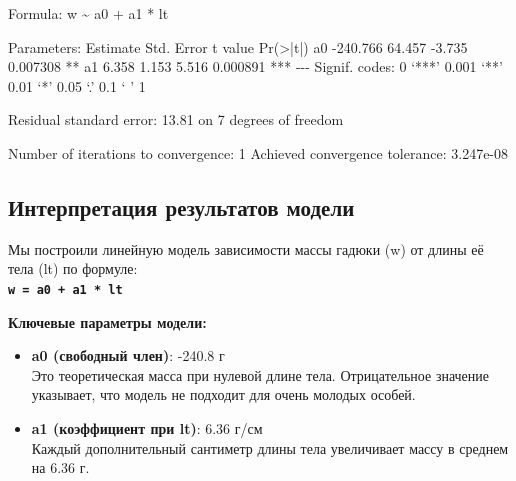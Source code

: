 \documentclass[
  letterpaper,
  DIV=11,
  numbers=noendperiod]{scrreprt}
\newenvironment{Shaded}{\begin{snugshade}}{\end{snugshade}}
\newcommand{\DecValTok}[1]{\textcolor[rgb]{0.68,0.00,0.00}{#1}}
\newcommand{\ErrorTok}[1]{\textcolor[rgb]{0.68,0.00,0.00}{#1}}
\newcommand{\FloatTok}[1]{\textcolor[rgb]{0.68,0.00,0.00}{#1}}
\newcommand{\FunctionTok}[1]{\textcolor[rgb]{0.28,0.35,0.67}{#1}}
\newcommand{\NormalTok}[1]{\textcolor[rgb]{0.00,0.23,0.31}{#1}}
\newcommand{\SpecialCharTok}[1]{\textcolor[rgb]{0.37,0.37,0.37}{#1}}
\begin{document}
\begin{Shaded}
\begin{Highlighting}[]
\NormalTok{Formula}\SpecialCharTok{:}\NormalTok{ w }\SpecialCharTok{\textasciitilde{}}\NormalTok{ a0 }\SpecialCharTok{+}\NormalTok{ a1 }\SpecialCharTok{*}\NormalTok{ lt}

\NormalTok{Parameters}\SpecialCharTok{:}
\NormalTok{   Estimate Std. Error t value }\FunctionTok{Pr}\NormalTok{(}\SpecialCharTok{\textgreater{}}\ErrorTok{|}\NormalTok{t}\SpecialCharTok{|}\NormalTok{)    }
\NormalTok{a0 }\SpecialCharTok{{-}}\FloatTok{240.766}     \FloatTok{64.457}  \SpecialCharTok{{-}}\FloatTok{3.735} \FloatTok{0.007308} \SpecialCharTok{**} 
\NormalTok{a1    }\FloatTok{6.358}      \FloatTok{1.153}   \FloatTok{5.516} \FloatTok{0.000891} \SpecialCharTok{**}\ErrorTok{*}
\SpecialCharTok{{-}{-}{-}}
\NormalTok{Signif. codes}\SpecialCharTok{:}  \DecValTok{0}\NormalTok{ ‘}\SpecialCharTok{**}\ErrorTok{*}\NormalTok{’ }\FloatTok{0.001}\NormalTok{ ‘}\SpecialCharTok{**}\NormalTok{’ }\FloatTok{0.01}\NormalTok{ ‘}\SpecialCharTok{*}\NormalTok{’ }\FloatTok{0.05}\NormalTok{ ‘.’ }\FloatTok{0.1}\NormalTok{ ‘ ’ }\DecValTok{1}

\NormalTok{Residual standard error}\SpecialCharTok{:} \FloatTok{13.81}\NormalTok{ on }\DecValTok{7}\NormalTok{ degrees of freedom}

\NormalTok{Number of iterations to convergence}\SpecialCharTok{:} \DecValTok{1} 
\NormalTok{Achieved convergence tolerance}\SpecialCharTok{:} \FloatTok{3.247e{-}08}
\end{Highlighting}
\end{Shaded}

\subsection{\texorpdfstring{\textbf{Интерпретация результатов
модели}}{Интерпретация результатов модели}}\label{ux438ux43dux442ux435ux440ux43fux440ux435ux442ux430ux446ux438ux44f-ux440ux435ux437ux443ux43bux44cux442ux430ux442ux43eux432-ux43cux43eux434ux435ux43bux438}

Мы построили линейную модель зависимости массы гадюки (w) от длины её
тела (lt) по формуле:\\
\textbf{\texttt{w\ =\ a0\ +\ a1\ *\ lt}}

\textbf{Ключевые параметры модели:}

\begin{itemize}
\item
  \textbf{a0 (свободный член)}: -240.8 г\\
  Это теоретическая масса при нулевой длине тела. Отрицательное значение
  указывает, что модель не подходит для очень молодых особей.
\item
  \textbf{a1 (коэффициент при lt)}: 6.36 г/см\\
  Каждый дополнительный сантиметр длины тела увеличивает массу в среднем
  на 6.36 г.
\end{itemize}
\end{document}
